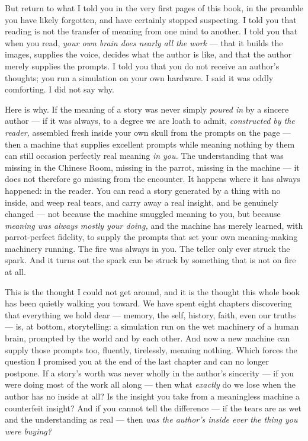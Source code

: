 But return to what I told you in the very first pages of this book, in the preamble you have likely forgotten, and have certainly stopped suspecting. I told you that reading is not the transfer of meaning from one mind to another. I told you that when you read, \emph{your own brain does nearly all the work} — that it builds the images, supplies the voice, decides what the author is like, and that the author merely supplies the prompts. I told you that you do not receive an author's thoughts; you run a simulation on your own hardware. I said it was oddly comforting. I did not say why.

Here is why. If the meaning of a story was never simply \emph{poured in} by a sincere author — if it was always, to a degree we are loath to admit, \emph{constructed by the reader,} assembled fresh inside your own skull from the prompts on the page — then a machine that supplies excellent prompts while meaning nothing by them can still occasion perfectly real meaning \emph{in you.} The understanding that was missing in the Chinese Room, missing in the parrot, missing in the machine — it does not therefore go missing from the encounter. It happens where it has always happened: in the reader. You can read a story generated by a thing with no inside, and weep real tears, and carry away a real insight, and be genuinely changed — not because the machine smuggled meaning to you, but because \emph{meaning was always mostly your doing,} and the machine has merely learned, with parrot-perfect fidelity, to supply the prompts that set your own meaning-making machinery running. The fire was always in you. The teller only ever struck the spark. And it turns out the spark can be struck by something that is not on fire at all.

This is the thought I could not get around, and it is the thought this whole book has been quietly walking you toward. We have spent eight chapters discovering that everything we hold dear — memory, the self, history, faith, even our truths — is, at bottom, storytelling: a simulation run on the wet machinery of a human brain, prompted by the world and by each other. And now a new machine can supply those prompts too, fluently, tirelessly, meaning nothing. Which forces the question I promised you at the end of the last chapter and can no longer postpone. If a story's worth was never wholly in the author's sincerity — if you were doing most of the work all along — then what \emph{exactly} do we lose when the author has no inside at all? Is the insight you take from a meaningless machine a counterfeit insight? And if you cannot tell the difference — if the tears are as wet and the understanding as real — then \emph{was the author's inside ever the thing you were buying?}


